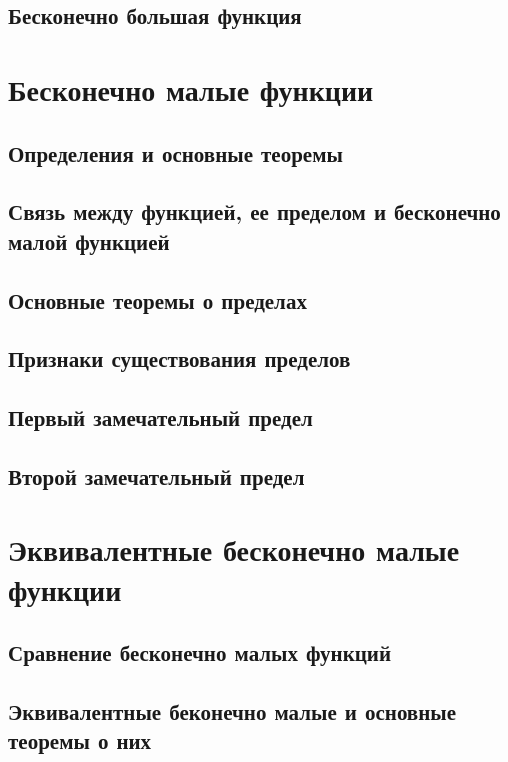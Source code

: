 \documentclass[14pt]{extreport}
\begin{document}
\section{Бесконечно большая функция}



\chapter{Бесконечно малые функции}

\section{Определения и основные теоремы}

\section{Связь между функцией, ее пределом и бесконечно малой функцией}

\section{Основные теоремы о пределах}

\section{Признаки существования пределов}

\section{Первый замечательный предел}

\section{Второй замечательный предел}



\chapter{Эквивалентные бесконечно малые функции}

\section{Сравнение бесконечно малых функций}

\section{Эквивалентные беконечно малые и основные теоремы о них}
\end{document}
